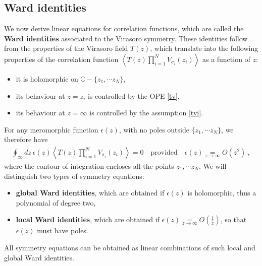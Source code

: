 \documentclass[12pt, a4paper, notitlepage, twoside]{report}
\numberwithin{equation}{section}
\theoremstyle{break}
\begin{document}
\subsection{Ward identities \label{secswi}}

We now derive linear equations for correlation functions, which are called the \textbf{\boldmath Ward identities} associated to the Virasoro symmetry.
These identities follow from the properties of the Virasoro field $T(z)$, which translate into the following properties of the correlation function $\left\langle T(z)\prod_{i=1}^N V_{\sigma_i}(z_i) \right\rangle$ as a function of $z$:
\begin{itemize}
 \item it is holomorphic on ${\mathbb{C}}-\{z_1,\cdots z_N\}$,
\item its behaviour at $z=z_i$ is controlled by the OPE \eqref{tv},
\item its behaviour at $z=\infty$ is controlled by the assumption \eqref{tyi}.
\end{itemize}
For any meromorphic function $\epsilon(z)$, with no poles outside $\{z_1,\cdots z_N\}$, we therefore have
\begin{align}
 \oint_\infty dz\ \epsilon(z) \left\langle T(z)\prod_{i=1}^N V_{\sigma_i}(z_i) \right\rangle = 0 \quad \text{provided} \quad \epsilon(z)\underset{z\to\infty}{=} O(z^2)\ ,
\label{oiz}
\end{align}
where the contour of integration encloses all the points $z_1,\cdots z_N$.
We will distinguish two types of symmetry equations:
\begin{itemize}
 \item \textbf{\boldmath global Ward identities}, which are obtained if $\epsilon(z)$ is holomorphic, thus a polynomial of degree two, 
\item \textbf{\boldmath local Ward identities}, which are obtained if $\epsilon(z) \underset{z\to\infty}{=} O(\frac{1}{z})$, so that $\epsilon(z)$ must have poles.
\end{itemize}
All symmetry equations can be obtained as linear combinations of such local and global Ward identities.
\end{document}
